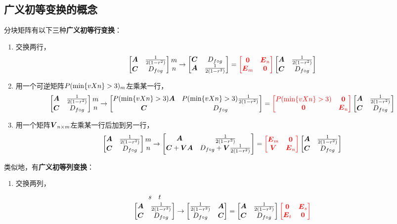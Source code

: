 \subsection{广义初等变换的概念}
\begin{definition}
\def\originalmatrix{%
	\begin{bmatrix}%
	\A & \B \\
	\C & \D
	\end{bmatrix}%
}%
\def\r#1{{\color{red}#1}}%
分块矩阵有以下三种\textbf{广义初等行变换}：
\def\originalmatrixTail{%
	\originalmatrix \begin{matrix} m \\ n \end{matrix}%
}%
\begin{enumerate}
\item 交换两行，\[
\originalmatrixTail \to \begin{bmatrix}
\C & \D \\
\A & \B
\end{bmatrix} = \r{\begin{bmatrix}
\z & \E_n \\
\E_m & \z
\end{bmatrix}} \originalmatrix
\]

\item 用一个可逆矩阵\(\P_m\)左乘某一行，\[
\originalmatrixTail \to \begin{bmatrix}
\P\A & \P\B \\
\C & \D
\end{bmatrix} = \r{\begin{bmatrix}
\P & \z \\
\z & \E_n
\end{bmatrix}} \originalmatrix
\]

\item 用一个矩阵\(\Q_{n \times m}\)左乘某一行后加到另一行，\[
\originalmatrixTail \to \begin{bmatrix}
\A & \B \\
\C+\Q\A & \D+\Q\B
\end{bmatrix} = \r{\begin{bmatrix}
\E_m & \z \\
\Q & \E_n
\end{bmatrix}} \originalmatrix
\]
\end{enumerate}

类似地，有\textbf{广义初等列变换}：
\def\originalmatrixHead{%
	\overset{\begin{matrix} s & t \end{matrix}}{ \originalmatrix }%
}%
\begin{enumerate}
\item 交换两列，\[
\originalmatrixHead \to \begin{bmatrix}
\B & \A \\
\D & \C
\end{bmatrix} = \originalmatrix \r{\begin{bmatrix}
\z & \E_s \\
\E_t & \z
\end{bmatrix}}
\]


\end{enumerate}
\end{definition}

